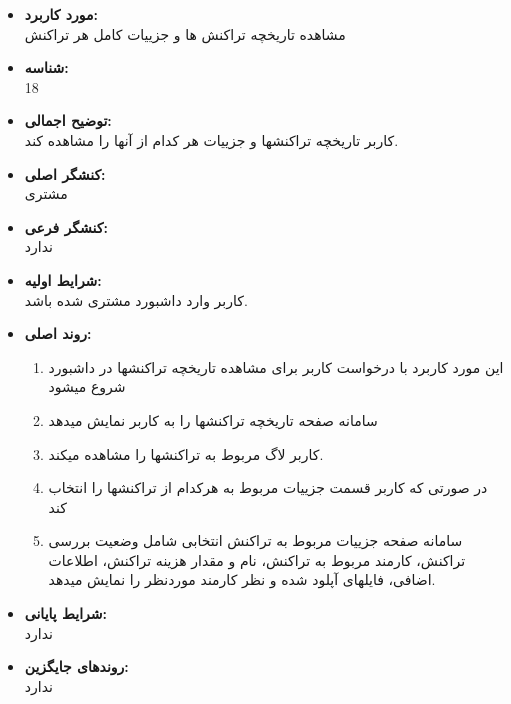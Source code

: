 \documentclass{article}
\begin{document}
\begin{itemize}
\item \textbf{مورد کاربرد:}\\
مشاهده تاریخچه تراکنش ها و جزییات کامل هر تراکنش
\item \textbf{شناسه:}\\
18
\item \textbf{توضیح اجمالی:}\\
کاربر تاریخچه تراکنشها و جزییات هر کدام از آنها را مشاهده کند.
\item \textbf{کنشگر اصلی:}\\
مشتری
\item \textbf{کنشگر فرعی:}\\
ندارد
\item \textbf{شرایط اولیه:}\\
کاربر وارد داشبورد مشتری شده باشد.
\item \textbf{روند اصلی:}\\
\begin{enumerate}
\item  این مورد کاربرد با درخواست کاربر برای مشاهده تاریخچه تراکنشها در داشبورد شروع میشود
\item سامانه صفحه  تاریخچه تراکنشها را به کاربر نمایش میدهد
\item کاربر لاگ مربوط به تراکنشها را مشاهده میکند.
\item  در صورتی که کاربر قسمت جزییات مربوط به هرکدام از تراکنشها را انتخاب کند
\item سامانه صفحه جزییات مربوط به تراکنش انتخابی شامل وضعیت بررسی تراکنش، کارمند مربوط به تراکنش، نام و مقدار هزینه تراکنش، اطلاعات اضافی، فایلهای آپلود شده و نظر کارمند موردنظر را نمایش میدهد.
\end{enumerate}
\item \textbf{شرایط پایانی:}\\ 
ندارد
\item \textbf{روندهای جایگزین:}\\
ندارد
\end{itemize}
\noindent\makebox[\linewidth]{\rule{\paperwidth}{0.4pt}}
\end{document}
